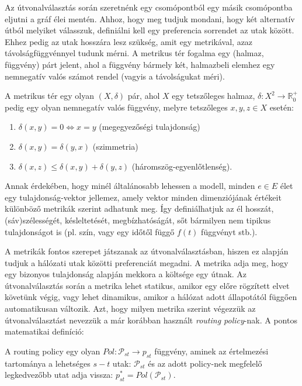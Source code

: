   Az útvonalválasztás során szeretnénk egy csomópontból egy másik csomópontba eljutni a gráf élei mentén. Ahhoz, hogy meg tudjuk mondani, hogy két alternatív útból melyiket válasszuk, definiálni kell egy preferencia sorrendet az utak között. Ehhez pedig az utak hosszára lesz szükség, amit egy metrikával, azaz távolságfüggvénnyel tudunk mérni. A metrikus tér fogalma egy (halmaz, függvény) párt jelent, ahol a függvény bármely két, halmazbeli elemhez egy nemnegatív valós számot rendel (vagyis a távolságukat méri).

  \begin{definition}\label{eq:MetrikusTerDef}
    A metrikus tér egy olyan $(X, \delta)$ pár, ahol $X$ egy tetszőleges halmaz, $\delta: X^{2} \rightarrow \mathbb{R}^{+}_{0}$ pedig egy olyan nemnegatív valós függvény, melyre tetszőleges $x, y, z \in X$ esetén:
    \begin{enumerate}
    \item \emph{ $\delta(x, y) = 0 \Leftrightarrow x = y$ } (megegyezőségi tulajdonság)
    \item \emph{ $\delta(x, y) = \delta(y, x)$ } (szimmetria)
    \item \emph{ $\delta(x, z) \leq \delta(x, y) + \delta(y, z)$ } (háromszög-egyenlőtlenség).
    \end{enumerate}
  \end{definition}

  Annak érdekében, hogy minél általánosabb lehessen a modell, minden $e \in E$ élet egy tulajdonság-vektor jellemez, amely vektor minden dimenziójának értékeit különböző metrikák szerint adhatunk meg. Így definiálhatjuk az él hosszát, (sáv)szélességét, késleltetését, megbízhatóságát, sőt bármilyen nem tipikus tulajdonságot is (pl. szín, vagy egy időtől függő $f(t)$ függvényt stb.).

  A metrikák fontos szerepet játszanak az útvonalválasztásban, hiszen ez alapján tudjuk a hálózati utak közötti preferenciát megadni. A metrika adja meg, hogy egy bizonyos tulajdonság alapján mekkora a költsége egy útnak. Az útvonalválasztás során a metrika lehet statikus, amikor egy előre rögzített elvet követünk végig, vagy lehet dinamikus, amikor a hálózat adott állapotától függően automatikusan változik. Azt, hogy milyen metrika szerint végezzük az útvonalválasztást nevezzük a már korábban használt \textit{routing policy}-nak. A pontos matematikai definíció:

  \begin{definition} \label{def:routing-policy}
    A routing policy egy olyan $Pol: \mathcal{P}_{st} \rightarrow p_{st}$ függvény, aminek az értelmezési tartománya a lehetséges $s - t$ utak: $\mathcal{P}_{st}$ és az adott policy-nek megfelelő legkedvezőbb utat adja vissza: $p_{st}^{*}=Pol(\mathcal{P}_{st})$.
  \end{definition}

